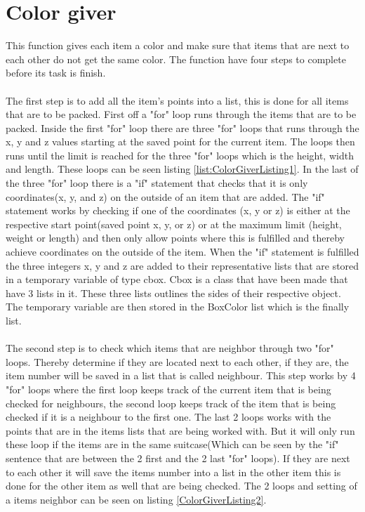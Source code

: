 \section{Color giver}
This function gives each item a color and make sure that items that are next to each other do not get the same color. The function have four steps to complete before its task is finish.\\
\\
The first step is to add all the item's points into a list, this is done for all items that are to be packed. First off a "for" loop runs through the items that are to be packed. Inside the first "for" loop there are three "for" loops that runs through the x, y and z values starting at the saved point for the current item. The loops then runs until the limit is reached for the three "for" loops which is the height, width and length. These loops can be seen listing \ref{list:ColorGiverListing1}. In the last of the three "for" loop there is a "if" statement that checks that it is only coordinates(x, y, and z) on the outside of an item that are added. The "if" statement works by checking if one of the coordinates (x, y or z) is either at the respective start point(saved point x, y, or z) or at the maximum limit (height, weight or length) and then only allow points where this is fulfilled and thereby achieve coordinates on the outside of the item.
When the "if" statement is fulfilled the three integers x, y and z are added to their representative lists that are stored in a temporary variable of type cbox. Cbox is a class that have been made that have 3 lists in it. These three lists outlines the sides of their respective object. The temporary variable are then stored in the BoxColor list which is the finally list.\\ 
\\
The second step is to check which items that are neighbor through two "for" loops. Thereby determine if they are located next to each other, if they are, the item number will be saved in a list that is called neighbour. This step works by 4 "for" loops where the first loop keeps track of the current item that is being checked for neighbours, the second loop keeps track of the item that is being checked if it is a neighbour to the first one. The last 2 loops works with the points that are in the items lists that are being worked with. But it will only run these loop if the items are in the same suitcase(Which can be seen by the "if" sentence that are between the 2 first and the 2 last "for" loops). If they are next to each other it will save the items number into a list in the other item this is done for the other item as well that are being checked. The 2 loops and setting of a items neighbor can be seen on listing \ref{ColorGiverListing2}.\\

